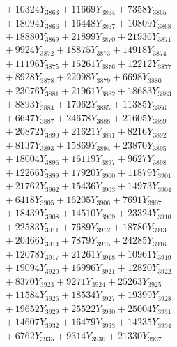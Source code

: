 \documentclass[a4paper,10pt]{article}
\begin{document}
{\begin{align}
&\;  + 10324 Y_{3863} + 11669 Y_{3864} + 7358 Y_{3865} \\[0.3ex]
&\;  + 18094 Y_{3866} + 16448 Y_{3867} + 10809 Y_{3868} \\[0.5ex]\allowbreak
&\;  + 18880 Y_{3869} + 21899 Y_{3870} + 21936 Y_{3871} \\[0.3ex]
&\;  + 9924 Y_{3872} + 18875 Y_{3873} + 14918 Y_{3874} \\[0.3ex]
&\;  + 11196 Y_{3875} + 15261 Y_{3876} + 12212 Y_{3877} \\[0.3ex]
&\;  + 8928 Y_{3878} + 22098 Y_{3879} + 6698 Y_{3880} \\[0.3ex]
&\;  + 23076 Y_{3881} + 21961 Y_{3882} + 18683 Y_{3883} \\[0.3ex]
&\;  + 8893 Y_{3884} + 17062 Y_{3885} + 11385 Y_{3886} \\[0.3ex]
&\;  + 6647 Y_{3887} + 24678 Y_{3888} + 21605 Y_{3889} \\[0.3ex]
&\;  + 20872 Y_{3890} + 21621 Y_{3891} + 8216 Y_{3892} \\[0.3ex]
&\;  + 8137 Y_{3893} + 15869 Y_{3894} + 23870 Y_{3895} \\[0.3ex]
&\;  + 18004 Y_{3896} + 16119 Y_{3897} + 9627 Y_{3898} \\[0.5ex]\allowbreak
&\;  + 12266 Y_{3899} + 17920 Y_{3900} + 11879 Y_{3901} \\[0.3ex]
&\;  + 21762 Y_{3902} + 15436 Y_{3903} + 14973 Y_{3904} \\[0.3ex]
&\;  + 6418 Y_{3905} + 16205 Y_{3906} + 7691 Y_{3907} \\[0.3ex]
&\;  + 18439 Y_{3908} + 14510 Y_{3909} + 23324 Y_{3910} \\[0.3ex]
&\;  + 22583 Y_{3911} + 7689 Y_{3912} + 18780 Y_{3913} \\[0.3ex]
&\;  + 20466 Y_{3914} + 7879 Y_{3915} + 24285 Y_{3916} \\[0.3ex]
&\;  + 12078 Y_{3917} + 21261 Y_{3918} + 10961 Y_{3919} \\[0.3ex]
&\;  + 19094 Y_{3920} + 16996 Y_{3921} + 12820 Y_{3922} \\[0.3ex]
&\;  + 8370 Y_{3923} + 9271 Y_{3924} + 25263 Y_{3925} \\[0.3ex]
&\;  + 11584 Y_{3926} + 18534 Y_{3927} + 19399 Y_{3928} \\[0.5ex]\allowbreak
&\;  + 19652 Y_{3929} + 25522 Y_{3930} + 25004 Y_{3931} \\[0.3ex]
&\;  + 14607 Y_{3932} + 16479 Y_{3933} + 14235 Y_{3934} \\[0.3ex]
&\;  + 6762 Y_{3935} + 9314 Y_{3936} + 21330 Y_{3937} \\[0.3ex]

\end{align}}
\end{document}
